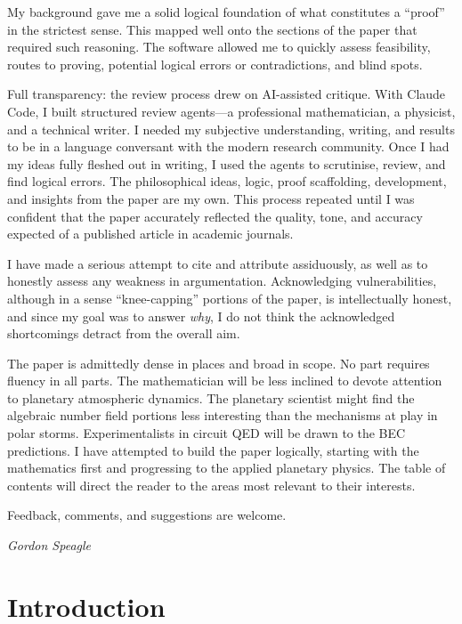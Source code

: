 \documentclass[12pt, a4paper]{article}
\numberwithin{equation}{section}
\begin{document}
My background gave me a solid logical foundation of what constitutes
a ``proof'' in the strictest sense.  This mapped well onto the sections
of the paper that required such reasoning.  The software allowed me to
quickly assess feasibility, routes to proving, potential logical errors
or contradictions, and blind spots.

Full transparency: the review process drew on AI-assisted critique.
With Claude Code, I built structured review agents---a professional
mathematician, a physicist, and a technical writer.  I needed my
subjective understanding, writing, and results to be in a language
conversant with the modern research community.  Once I had my ideas
fully fleshed out in writing, I used the agents to scrutinise, review,
and find logical errors.  The philosophical ideas, logic, proof
scaffolding, development, and insights from the paper are my own.
This process repeated until I was confident that the paper accurately
reflected the quality, tone, and accuracy expected of a published
article in academic journals.

I have made a serious attempt to cite and attribute assiduously, as
well as to honestly assess any weakness in argumentation.
Acknowledging vulnerabilities, although in a sense ``knee-capping''
portions of the paper, is intellectually honest, and since my goal was
to answer \emph{why}, I do not think the acknowledged shortcomings
detract from the overall aim.

The paper is admittedly dense in places and broad in scope.  No part
requires fluency in all parts.  The mathematician will be less inclined
to devote attention to planetary atmospheric dynamics.  The planetary
scientist might find the algebraic number field portions less
interesting than the mechanisms at play in polar storms.
Experimentalists in circuit QED will be drawn to the BEC predictions.
I have attempted to build the paper logically, starting with the
mathematics first and progressing to the applied planetary physics.
The table of contents will direct the reader to the areas most
relevant to their interests.

Feedback, comments, and suggestions are welcome.

\begin{flushright}
\emph{Gordon Speagle}
\end{flushright}

\section{Introduction}
\label{sec:intro}
\end{document}
